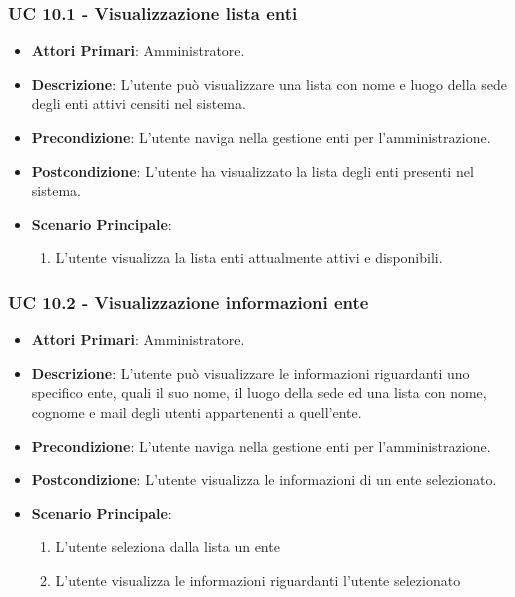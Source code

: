 			\subsubsection{UC 10.1 - Visualizzazione lista enti }
			\begin{itemize}
				\item \textbf{Attori Primari}: Amministratore.
				\item \textbf{Descrizione}: L'utente può visualizzare una lista con nome e luogo della sede degli enti attivi censiti nel sistema.
				\item \textbf{Precondizione}: L'utente naviga nella gestione enti per l'amministrazione.
				\item \textbf{Postcondizione}: L'utente ha visualizzato la lista degli enti presenti nel sistema.
				\item \textbf{Scenario Principale}:
				\begin{enumerate}
					\item{L'utente visualizza la lista enti attualmente attivi e disponibili.}
				\end{enumerate}	
			\end{itemize}

			\subsubsection{UC 10.2 - Visualizzazione informazioni ente}
			\begin{itemize}
				\item \textbf{Attori Primari}: Amministratore.
				\item \textbf{Descrizione}: L'utente può visualizzare le informazioni riguardanti uno specifico ente, quali il suo nome, il luogo della sede ed una lista con nome, cognome e mail degli utenti appartenenti a quell'ente.
				\item \textbf{Precondizione}: L'utente naviga nella gestione enti per l'amministrazione.
				\item \textbf{Postcondizione}: L'utente visualizza le informazioni di un ente selezionato.
				\item \textbf{Scenario Principale}:
				\begin{enumerate}
					\item{L'utente seleziona dalla lista un ente}
					\item{L'utente visualizza le informazioni riguardanti l'utente selezionato}
				\end{enumerate}	
			\end{itemize}

